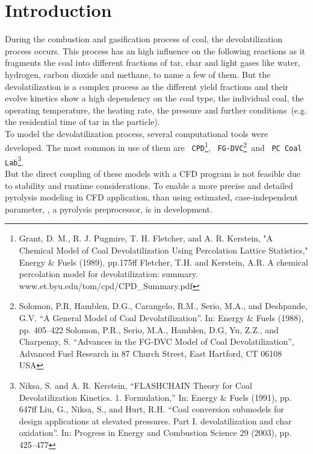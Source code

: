 \section{Introduction}
During the combustion and gasification process of coal, the devolatilization process occurs. This process has an high influence on the following reactions as it fragments the coal into different fractions of tar, char and light gases like water, hydrogen, carbon dioxide and methane, to name a few of them. But the devolatilization is a complex process as the different yield fractions and their evolve kinetics show a high dependency on the coal type, the individual coal, the operating temperature, the heating rate, the pressure and further conditions~(e.g. the residential time of tar in the particle).\\
To model the devolatilization process, several computational tools were developed. The most common in use of them are~
\texttt{CPD}\footnote{Grant, D. M., R. J. Pugmire, T. H. Fletcher, and A. R. Kerstein, "A Chemical Model of Coal Devolatilization Using Percolation Lattice Statistics," Energy \& Fuels (1989), pp.175ff \newline Fletcher, T.H. and Kerstein, A.R. A chemical percolation model for devolatilization: summary.
www.et.byu.edu/\texttildelow tom/cpd/CPD\_Summary.pdf},~
\texttt{FG-DVC}\footnote{Solomon, P.R, Hamblen, D.G., Carangelo, R.M., Serio, M.A., and Deshpande, G.V. ``A General Model of Coal Devolatilization''. In: Energy \& Fuels (1988), pp. 405–422 \newline Solomon, P.R., Serio, M.A., Hamblen, D.G, Yu, Z.Z., and Charpenay, S. ``Advances in the FG-DVC Model of Coal Devolatilization'', Advanced Fuel Research in 87 Church Street, East Hartford, CT 06108 USA}~and~
\texttt{PC Coal Lab}\footnote{Niksa, S. and A. R. Kerstein, ``FLASHCHAIN Theory for Coal Devolatilization Kinetics. 1. Formulation,'' In: Energy \& Fuels (1991), pp. 647ff \newline Liu, G., Niksa, S., and Hurt, R.H. “Coal conversion submodels for design applications at elevated pressures. Part I. devolatilization and char oxidation”. In: Progress in Energy and Combustion Science 29 (2003), pp. 425–477}.\\
But the direct coupling of these models with a CFD program is not feasible due to stability and runtime considerations. To enable a more precise and detailed pyrolysis modeling in CFD application, than using estimated, case-independent parameter, \PKP, a pyrolysis preprocessor, is in development.

